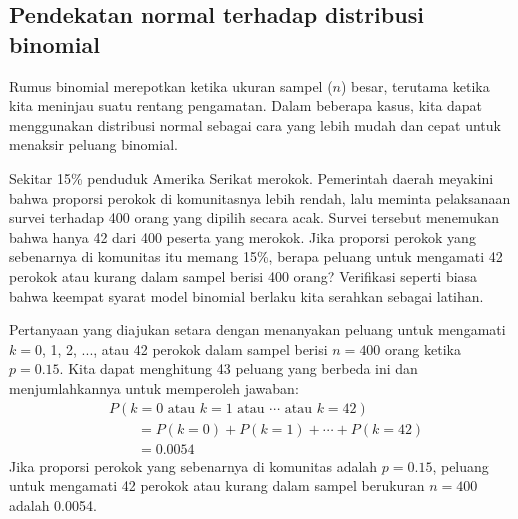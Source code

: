 \newpage


\subsection{Pendekatan normal terhadap distribusi binomial}
\label{normalApproxBinomialDistSubsection}


Rumus binomial merepotkan ketika ukuran sampel ($n$) besar, terutama
ketika kita meninjau suatu rentang pengamatan. Dalam beberapa kasus,
kita dapat menggunakan distribusi normal sebagai cara yang lebih mudah
dan cepat untuk menaksir peluang binomial.

\newcommand{\smokeprop}{0.15}
\newcommand{\smokeperc}{15\%}
\newcommand{\smokepropcomp}{0.85}
\newcommand{\smokeperccomp}{85\%}
\newcommand{\smokex}{42}
\newcommand{\smokexplusone}{43}
\newcommand{\smoken}{400}
\newcommand{\smokelowertailbinom}{0.0054}
\newcommand{\smokemean}{60}
\newcommand{\smokemeancomp}{340}
\newcommand{\smokesd}{7.14}
\newcommand{\smokez}{-2.52}
\newcommand{\smokelowertailnormal}{0.0059}

\begin{examplewrap}
\begin{nexample}{Sekitar \smokeperc{} penduduk Amerika Serikat merokok.
    Pemerintah daerah meyakini bahwa proporsi perokok di komunitasnya
    lebih rendah, lalu meminta pelaksanaan survei terhadap 400 orang yang
    dipilih secara acak. Survei tersebut menemukan bahwa hanya \smokex{} dari
    \smoken{} peserta yang merokok. Jika proporsi perokok yang sebenarnya
    di komunitas itu memang \smokeperc{}, berapa peluang untuk mengamati
    \smokex{} perokok atau kurang dalam sampel berisi \smoken{} orang?}
  \label{exactBinomSmokerExSetup}%
  Verifikasi seperti biasa bahwa keempat syarat model binomial berlaku
  kita serahkan sebagai latihan.

  Pertanyaan yang diajukan setara dengan menanyakan peluang untuk
  mengamati $k=0$, 1, 2, ..., atau \smokex{} perokok dalam sampel berisi
  $n=\smoken{}$ orang ketika $p=\smokeprop{}$. Kita dapat menghitung
  \smokexplusone{} peluang yang berbeda ini dan menjumlahkannya untuk
  memperoleh jawaban:
  \begin{align*}
  &P(k=0\text{ atau }k=1\text{ atau }\cdots\text{ atau } k=\smokex{}) \\
	&\qquad = P(k=0) + P(k=1) + \cdots + P(k=\smokex{}) \\
	&\qquad = \smokelowertailbinom{}
  \end{align*}
  Jika proporsi perokok yang sebenarnya di komunitas adalah
  $p=\smokeprop{}$, peluang untuk mengamati \smokex{} perokok atau kurang
  dalam sampel berukuran $n=\smoken{}$ adalah \smokelowertailbinom{}.
\end{nexample}
\end{examplewrap}

